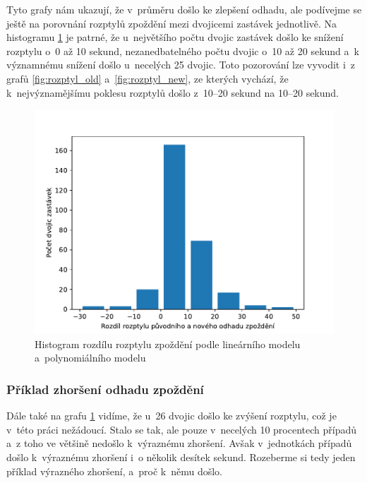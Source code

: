 \bigbreak

Tyto grafy nám ukazují, že v~průměru došlo ke zlepšení odhadu, ale podívejme se ještě na porovnání rozptylů zpoždění mezi dvojicemi zastávek jednotlivě. Na histogramu \ref{fig:rozptyl_diff} je patrné, že u~největšího počtu dvojic zastávek došlo ke snížení rozptylu o~0 až 10 sekund, nezanedbatelného počtu dvojic o~10 až 20 sekund a~k významnému snížení došlo u~necelých 25 dvojic. Toto pozorování lze vyvodit i~z grafů \ref{fig:rozptyl_old} a~\ref{fig:rozptyl_new}, ze kterých vychází, že k~nejvýznamějšímu poklesu rozptylů došlo z~10--20 sekund na 10--20 sekund.


\begin{figure}
   \centering
 \includegraphics[width=1\linewidth]{../img/rozptyl_diff}
 \caption{Histogram rozdílu rozptylu zpoždění podle lineárního modelu a~polynomiálního modelu}
 \label{fig:rozptyl_diff}
\end{figure}


\subsubsection{Příklad zhoršení odhadu zpoždění}

Dále také na grafu \ref{fig:rozptyl_diff} vidíme, že u~26 dvojic došlo ke zvýšení rozptylu, což je v~této práci nežádoucí. Stalo se tak, ale pouze v~necelých 10 procentech případů a~z toho ve většině nedošlo k~výraznému zhoršení. Avšak v~jednotkách případů došlo k~výraznému zhoršení i~o několik desítek sekund. Rozeberme si tedy jeden příklad výrazného zhoršení, a~proč k~němu došlo.



